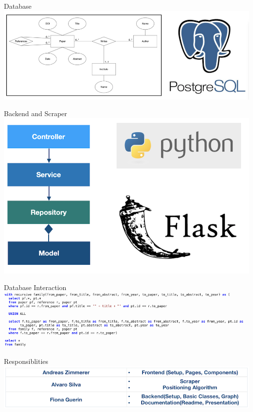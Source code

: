 \documentclass{beamer}
\begin{document}
\begin{frame}{Database}
    \includegraphics{img_07.png}
\end{frame}

\begin{frame}{Backend and Scraper}
    \includegraphics{img_08.png}
\end{frame}

\begin{frame}{Database Interaction}
    \includegraphics{img_09.png}
\end{frame}

\begin{frame}{Responsiblities}
    \includegraphics{img_10.png}
\end{frame}
\end{document}
